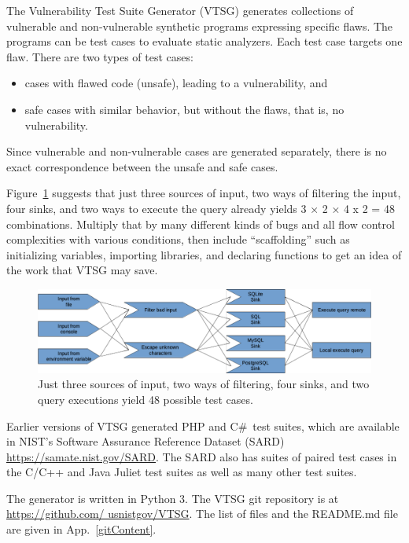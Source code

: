 \documentclass[12pt]{article}
\newcommand{\CSharp}{C{\fontseries{b}\selectfont\#}}
\begin{document}
The Vulnerability Test Suite Generator (VTSG) generates collections 
of vulnerable and non-vulnerable
synthetic programs expressing specific flaws.  
The programs can be
test cases to evaluate static analyzers. 
Each test case targets one flaw. There are two types of test cases:
\begin{itemize}[nosep]
  \item cases with flawed code (unsafe), leading to a vulnerability, and
  \item safe cases with similar behavior, but without the flaws, that is, no
	vulnerability.
\end{itemize}
Since vulnerable and non-vulnerable cases are generated separately, there is no
exact correspondence between the unsafe and safe
cases.

Figure~\ref{fig:cartesian product} suggests that just three sources of input,
two ways of filtering the input, four sinks, and two ways to execute the query
already yields 3 × 2 × 4 x 2 = 48
combinations.  Multiply that by many different kinds of bugs and all flow control
complexities with various conditions, then include ``scaffolding'' such as
initializing variables, importing libraries, and declaring functions to get an
idea of the work that VTSG may save.

\begin{figure}[htbp]
  \includegraphics[width=1\linewidth]{fig_cartesian_product.png}
  \caption{Just three sources of input, two ways of filtering, four sinks, and
    two query executions yield 48 possible test cases.}
  \label{fig:cartesian product}
\end{figure}

Earlier versions of VTSG generated PHP and \CSharp\ test suites, which are
available in NIST's Software Assurance Reference Dataset (SARD)
\href{https://samate.nist.gov/SARD}{https://samate.nist.gov/SARD}.
The SARD also has suites of paired test cases in the C/C++ and Java Juliet test
suites as well as many other test suites.

The generator is written in Python 3.
The VTSG git repository is at
\href{https://github.com/usnistgov/VTSG}{https://github.com/ usnistgov/VTSG}.
The list of files and the README.md file are given in App.~\ref{gitContent}.
\end{document}
